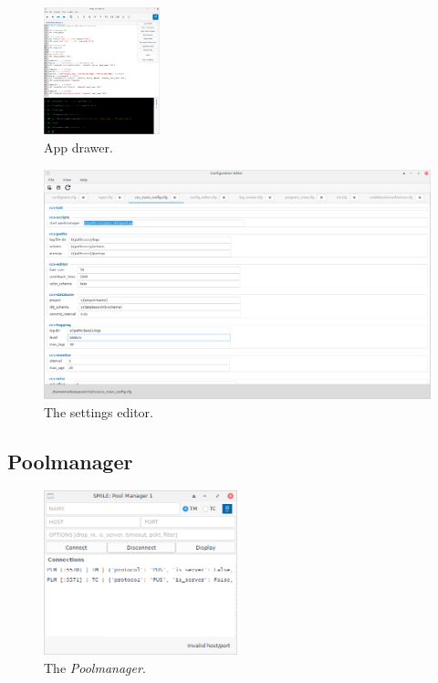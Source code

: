 \begin{figure}\label{fig:appdraw}
\centering
\includegraphics[width=0.3\textwidth]{../shared/images/editor_appdrawer.png} 
\caption{App drawer.}
\end{figure}

\begin{figure}\label{fig:settings}
\includegraphics[width=1.\textwidth]{../shared/images/config_editor.png} 
\caption{The settings editor.}
\end{figure}

\subsection{Poolmanager}
\begin{figure}\label{fig:pmgr}
\centering
\includegraphics[width=0.5\textwidth]{../shared/images/pmgr.png} 
\caption{The \emph{Poolmanager}.}
\end{figure}

